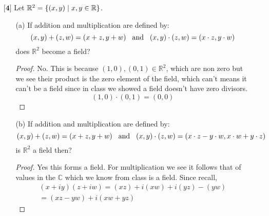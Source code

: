 \documentclass[12pt]{article}
\newcommand      {\Rm}         {{\mathbb R}}
\newcommand      {\Cm}         {{\mathbb C}}
\begin{document}
\begin{itemize}
\begin{proof}
    \end{proof}

    \vspace{.5cm}
    
    \item[$\textbf{[4]}$]%
    Let $\mathbb{R}^2 = \{ (x,y) \hspace{.1cm} | \hspace{.1cm} x,y \in \mathbb{R} \}$. 
    \begin{itemize}
    
    \vspace{.3cm}
    \item[(a)]
    If addition and multiplication are defined by:
    \begin{equation*}
    (x,y) + (z,w) = (x + z,y + w) \hspace{.3cm} \text{and} \hspace{.3cm} (x,y) \cdot (z,w) = (x \cdot z,y \cdot w)
    \end{equation*}
    does $\mathbb{R}^2$ become a field?

    \begin{proof}
        No. This is because $(1,0),(0,1)\in \Rm^2$, which are non zero but we see their product is the zero element of the field, which can't means it can't be a field since in class we showed a field doesn't have zero divisors. 
        \[(1,0)\cdot(0,1) = (0,0)\] 
    \end{proof}
    
    \vspace{.3cm}
    \item[(b)]
    If addition and multiplication are defined by:
    \begin{equation*}
    (x,y) + (z,w) = (x + z,y + w) \hspace{.3cm} \text{and} \hspace{.3cm} (x,y) \cdot (z,w) = (x \cdot z - y \cdot w,x \cdot w + y \cdot z)
    \end{equation*}
    is $\mathbb{R}^2$ a field then?

    \begin{proof}
        Yes this forms a field. For multiplication we see it follows that of values in the $\Cm$ which we know from class is a field. Since recall,
        \begin{align*}
            (x+iy)(z+iw) = (xz) + i(xw) + i(yz) -(yw) \\
            = (xz -yw) + i(xw + yz)
        \end{align*}


\end{proof}
\end{itemize}
\end{itemize}
\end{document}
